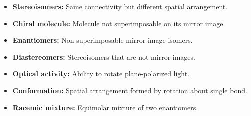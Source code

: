 \documentclass[12pt,a4paper]{article}
\begin{document}
\begin{tcolorbox}[defbox, title={One-Line Definitions}]
\begin{itemize}[leftmargin=*, itemsep=2pt, topsep=2pt]
  \item \textbf{Stereoisomers:} Same connectivity but different spatial arrangement.
  \item \textbf{Chiral molecule:} Molecule not superimposable on its mirror image.
  \item \textbf{Enantiomers:} Non-superimposable mirror-image isomers.
  \item \textbf{Diastereomers:} Stereoisomers that are not mirror images.
  \item \textbf{Optical activity:} Ability to rotate plane-polarized light.
  \item \textbf{Conformation:} Spatial arrangement formed by rotation about single bond.
  \item \textbf{Racemic mixture:} Equimolar mixture of two enantiomers.
\end{itemize}
\end{tcolorbox}
\end{document}
